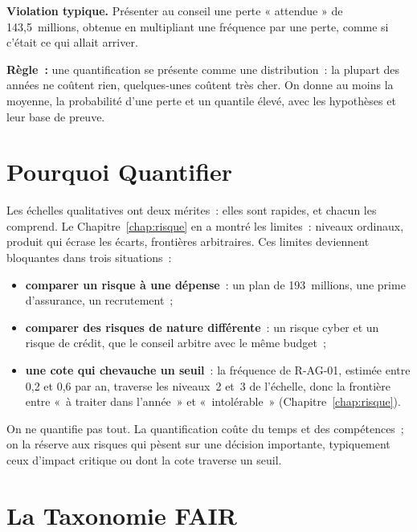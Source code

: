 \begin{boxalert}
\textbf{Violation typique.} Présenter au conseil une perte « attendue » de
143,5~millions, obtenue en multipliant une fréquence par une perte, comme
si c'était ce qui allait arriver.

\smallskip
\textbf{Règle~:} une quantification se présente comme une distribution~:
la plupart des années ne coûtent rien, quelques-unes coûtent très cher. On
donne au moins la moyenne, la probabilité d'une perte et un quantile élevé,
avec les hypothèses et leur base de preuve.
\end{boxalert}

\separateur

\section{Pourquoi Quantifier}
\label{sec:c05-pourquoi}

Les échelles qualitatives ont deux mérites~: elles sont rapides, et
chacun les comprend. Le Chapitre~\ref{chap:risque} en a montré les
limites~: niveaux ordinaux, produit qui écrase les écarts, frontières
arbitraires. Ces limites deviennent bloquantes dans trois situations~:
\begin{itemize}
    \item \textbf{comparer un risque à une dépense}~: un plan de
          193~millions, une prime d'assurance, un recrutement~;
    \item \textbf{comparer des risques de nature différente}~: un risque
          cyber et un risque de crédit, que le conseil arbitre avec le même
          budget~;
    \item \textbf{une cote qui chevauche un seuil}~: la fréquence de
          R-AG-01, estimée entre 0,2 et 0,6 par an, traverse les niveaux~2
          et~3 de l'échelle, donc la frontière entre «~à traiter dans
          l'année~» et «~intolérable~» (Chapitre~\ref{chap:risque}).
\end{itemize}

On ne quantifie pas tout. La quantification coûte du temps et des
compétences~; on la réserve aux risques qui pèsent sur une décision
importante, typiquement ceux d'impact critique ou dont la cote traverse un
seuil.

\section{La Taxonomie FAIR}
\label{sec:c05-taxonomie}

